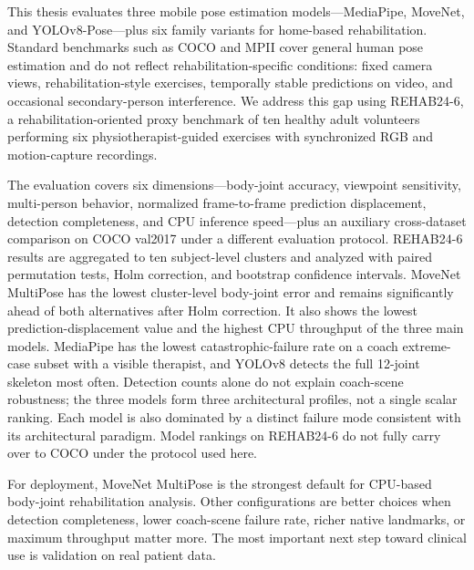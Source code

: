 This thesis evaluates three mobile pose estimation models---MediaPipe, MoveNet, and YOLOv8-Pose---plus six family variants for home-based rehabilitation. Standard benchmarks such as COCO and MPII cover general human pose estimation and do not reflect rehabilitation-specific conditions: fixed camera views, rehabilitation-style exercises, temporally stable predictions on video, and occasional secondary-person interference. We address this gap using REHAB24-6, a rehabilitation-oriented proxy benchmark of ten healthy adult volunteers performing six physiotherapist-guided exercises with synchronized RGB and motion-capture recordings.

The evaluation covers six dimensions---body-joint accuracy, viewpoint sensitivity, multi-person behavior, normalized frame-to-frame prediction displacement, detection completeness, and CPU inference speed---plus an auxiliary cross-dataset comparison on COCO val2017 under a different evaluation protocol. REHAB24-6 results are aggregated to ten subject-level clusters and analyzed with paired permutation tests, Holm correction, and bootstrap confidence intervals. MoveNet MultiPose has the lowest cluster-level body-joint error and remains significantly ahead of both alternatives after Holm correction. It also shows the lowest prediction-displacement value and the highest CPU throughput of the three main models. MediaPipe has the lowest catastrophic-failure rate on a coach extreme-case subset with a visible therapist, and YOLOv8 detects the full 12-joint skeleton most often. Detection counts alone do not explain coach-scene robustness; the three models form three architectural profiles, not a single scalar ranking. Each model is also dominated by a distinct failure mode consistent with its architectural paradigm. Model rankings on REHAB24-6 do not fully carry over to COCO under the protocol used here.

For deployment, MoveNet MultiPose is the strongest default for CPU-based body-joint rehabilitation analysis. Other configurations are better choices when detection completeness, lower coach-scene failure rate, richer native landmarks, or maximum throughput matter more. The most important next step toward clinical use is validation on real patient data.
